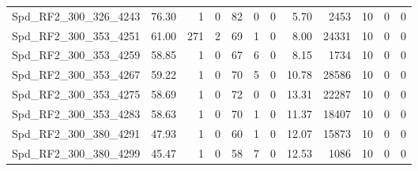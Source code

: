 \begin{longtable}[c]{@{}lrrrrrrrrrrr@{}}
Spd\_RF2\_300\_326\_4243     & 76.30                  & 1                       & 0                       & 82                     & 0                       & 0                       & 5.70                    & 2453                     & 10                       & 0                        & 0                        \\
Spd\_RF2\_300\_353\_4251     & 61.00                  & 271                     & 2                       & 69                     & 1                       & 0                       & 8.00                    & 24331                    & 10                       & 0                        & 0                        \\
Spd\_RF2\_300\_353\_4259     & 58.85                  & 1                       & 0                       & 67                     & 6                       & 0                       & 8.15                    & 1734                     & 10                       & 0                        & 0                        \\
Spd\_RF2\_300\_353\_4267     & 59.22                  & 1                       & 0                       & 70                     & 5                       & 0                       & 10.78                   & 28586                    & 10                       & 0                        & 0                        \\
Spd\_RF2\_300\_353\_4275     & 58.69                  & 1                       & 0                       & 72                     & 0                       & 0                       & 13.31                   & 22287                    & 10                       & 0                        & 0                        \\
Spd\_RF2\_300\_353\_4283     & 58.63                  & 1                       & 0                       & 70                     & 1                       & 0                       & 11.37                   & 18407                    & 10                       & 0                        & 0                        \\
Spd\_RF2\_300\_380\_4291     & 47.93                  & 1                       & 0                       & 60                     & 1                       & 0                       & 12.07                   & 15873                    & 10                       & 0                        & 0                        \\
Spd\_RF2\_300\_380\_4299     & 45.47                  & 1                       & 0                       & 58                     & 7                       & 0                       & 12.53                   & 1086                     & 10                       & 0                        & 0                        \\

\end{longtable}
